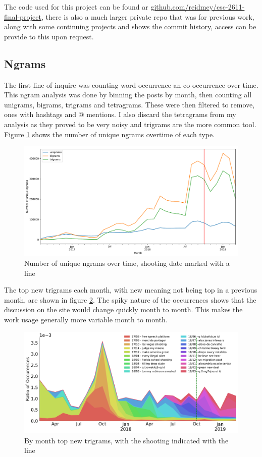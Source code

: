\documentclass[letterpaper]{article}
\begin{document}
The code used for this project can be found ar \href{https://github.com/reidmcy/csc-2611-final-project}{github.com/reidmcy/csc-2611-final-project}, there is also a much larger private repo that was for previous work, along with some continuing projects and shows the commit history, access can be provide to this upon request. 

\subsection{Ngrams}

The first line of inquire was counting word occurrence an co-occurrence over time. This ngram analysis was done by binning the posts by month, then counting all unigrams, bigrams, trigrams and tetragrams. These were then filtered to remove, ones with hashtags and @ mentions. I also discard the tetragrams from my analysis as they proved to be very noisy and trigrams are the more common tool. Figure \ref{ngrams} shows the number of unique ngrams overtime of each type.


\begin{figure}[h!]
	\centering
	\includegraphics[width=\textwidth]{ngrams_overtime.pdf}
	\caption{Number of unique ngrams over time, shooting date marked with a line}\label{ngrams}
\end{figure}

The top new trigrams each month, with new meaning not being top in a previous month, are shown in figure \ref{top_tri}. The spiky nature of the occurrences shows that the discussion on the site would change quickly month to month. This makes the work usage generally more variable month to month. 

\begin{figure}[h!]
	\centering
	\includegraphics[width=\textwidth]{trigrams_norepost.pdf}
\caption{By month top new trigrams, with the shooting indicated with the line}\label{top_tri}
\end{figure}
\end{document}
